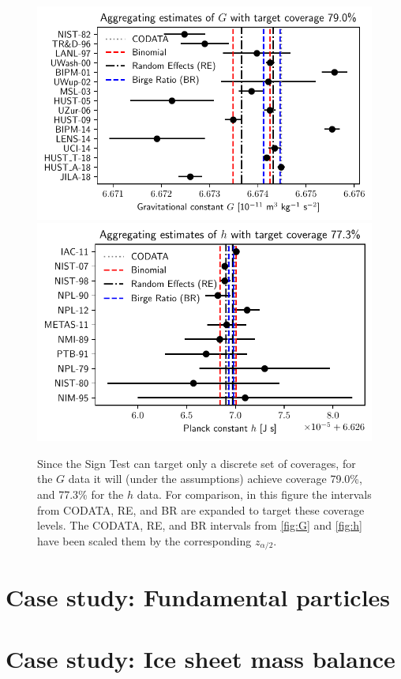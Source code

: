 \documentclass[12pt]{article}
\begin{document}
\begin{figure}[h]
\centering
\includegraphics{figs/G1.pdf}
\includegraphics{figs/h1.pdf}
\label{fig:Gh-wider}
\caption{Since the Sign Test can target only a discrete set of coverages, for the $G$ data it will (under the assumptions) achieve coverage 79.0\%, and 77.3\% for the $h$ data. For comparison, in this figure the intervals from CODATA, RE, and BR are expanded to target these coverage levels. The CODATA, RE, and BR intervals from \ref{fig:G} and \ref{fig:h} have been scaled them by the corresponding $z_{\alpha/2}$.}
\end{figure}

\section{Case study: Fundamental particles}\label{case-study-fundamental-particles}

\section{Case study: Ice sheet mass balance}\label{case-study-ice-sheet-mass-balance}
\end{document}
